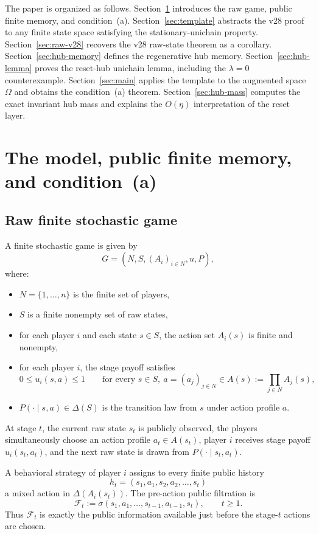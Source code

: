 \documentclass[11pt]{article}
\theoremstyle{definition}
\newcommand{\1}{\mathbf{1}}
\begin{document}
The paper is organized as follows. Section~\ref{sec:model} introduces the raw game, public finite memory, and condition~(a). Section~\ref{sec:template} abstracts the v28 proof to any finite state space satisfying the stationary-unichain property. Section~\ref{sec:raw-v28} recovers the v28 raw-state theorem as a corollary. Section~\ref{sec:hub-memory} defines the regenerative hub memory. Section~\ref{sec:hub-lemma} proves the reset-hub unichain lemma, including the $\lambda=0$ counterexample. Section~\ref{sec:main} applies the template to the augmented space $\Omega$ and obtains the condition~(a) theorem. Section~\ref{sec:hub-mass} computes the exact invariant hub mass and explains the $O(\eta)$ interpretation of the reset layer.

\section{The model, public finite memory, and condition~(a)}\label{sec:model}

\subsection{Raw finite stochastic game}

A finite stochastic game is given by
\[
G=(N,S,(A_i)_{i\in N},u,P),
\]
where:
\begin{itemize}[leftmargin=2.3em]
\item $N=\{1,\dots,n\}$ is the finite set of players,
\item $S$ is a finite nonempty set of raw states,
\item for each player $i$ and each state $s\in S$, the action set $A_i(s)$ is finite and nonempty,
\item for each player $i$, the stage payoff satisfies
\[
0\le u_i(s,a)\le 1
\qquad\text{for every }s\in S,\ a=(a_j)_{j\in N}\in A(s):=\prod_{j\in N}A_j(s),
\]
\item $P(\cdot\mid s,a)\in\Delta(S)$ is the transition law from $s$ under action profile $a$.
\end{itemize}

At stage $t$, the current raw state $s_t$ is publicly observed, the players simultaneously choose an action profile $a_t\in A(s_t)$, player $i$ receives stage payoff $u_i(s_t,a_t)$, and the next raw state is drawn from $P(\cdot\mid s_t,a_t)$.

A behavioral strategy of player $i$ assigns to every finite public history
\[
h_t=(s_1,a_1,s_2,a_2,\dots,s_t)
\]
a mixed action in $\Delta(A_i(s_t))$. The pre-action public filtration is
\[
\mathcal F_t:=\sigma(s_1,a_1,\dots,s_{t-1},a_{t-1},s_t),
\qquad t\ge1.
\]
Thus $\mathcal F_t$ is exactly the public information available just before the stage-$t$ actions are chosen.
\end{document}
